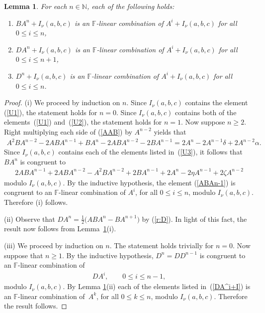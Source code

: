 \documentclass[pdftex]{sigma}
\def\N{\mathbb N}
\def\F{\mathbb F}
\numberwithin{equation}{section}
\newtheorem{Lemma}[Theorem]{Lemma}
\begin{document}
\begin{Lemma}\label{lem:cosets}For each $n\in \N$, each of the following holds:
\begin{enumerate}\itemsep=0pt
\item[$(i)$] $BA^n+I_\nu(a,b,c)$ is an $\F$-linear combination of $A^i+I_\nu(a,b,c)$ for all $0\leq i\leq n$,
\item[$(ii)$] $DA^n+I_\nu(a,b,c)$ is an $\F$-linear combination of $A^i+I_\nu(a,b,c)$ for all $0\leq i\leq n+1$,
\item[$(iii)$] $D^n+I_\nu(a,b,c)$ is an $\F$-linear combination of $A^i+I_\nu(a,b,c)$ for all $0\leq i\leq n$.
\end{enumerate}
\end{Lemma}
\begin{proof} (i) We proceed by induction on $n$. Since $I_\nu(a,b,c)$ contains the element (\ref{U1}), the statement holds for $n=0$. Since $I_\nu(a,b,c)$ contains both of the elements~(\ref{U1}) and~(\ref{U2}), the statement holds for $n=1$. Now suppose $n\geq 2$. Right multiplying each side of (\ref{AAB}) by $A^{n-2}$ yields that
\begin{gather*}
A^2 B A^{n-2}
-2 A B A^{n-1}
+B A^n
-2 A B A^{n-2}
-2 B A^{n-1}
=2 A^n-2 A^{n-1}\delta+2A^{n-2}\alpha.
\end{gather*}
Since $I_\nu(a,b,c)$ contains each of the elements listed in~(\ref{U3}), it follows that $B A^n$ is congruent to
\begin{gather}\label{ABAn-1}
2 A B A^{n-1}+2 A B A^{n-2}-A^2 B A^{n-2}+2 B A^{n-1}+2 A^n-2\eta A^{n-1}+2\zeta A^{n-2}
\end{gather}
modulo $I_\nu(a,b,c)$. By the inductive hypothesis, the element (\ref{ABAn-1}) is congruent to an $\F$-linear combination of $A^i$, for all $0\leq i\leq n$, modulo $I_\nu(a,b,c)$. Therefore (i) follows.

(ii) Observe that $DA^n=\frac{1}{2}\big(ABA^{n}-BA^{n+1}\big)$ by (\ref{r:D}). In light of this fact, the result now follows from Lemma~\ref{lem:cosets}(i).

(iii) We proceed by induction on $n$. The statement holds trivially for $n=0$. Now suppose that $n\geq 1$. By the inductive hypothesis, $D^n=DD^{n-1}$ is congruent to an $\F$-linear combination of
\begin{gather}\label{DA^i+I}
DA^i, \qquad 0\leq i\leq n-1,
\end{gather}
modulo $I_\nu(a,b,c)$. By Lemma \ref{lem:cosets}(ii) each of the elements listed in~(\ref{DA^i+I}) is an $\F$-linear combination of~$A^k$, for all $0\leq k\leq n$, modulo $I_\nu(a,b,c)$. Therefore the result follows.
\end{proof}
\end{document}
